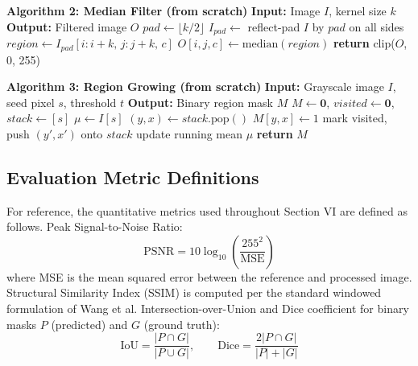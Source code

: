 \documentclass[conference]{IEEEtran}
\begin{document}
\begin{algorithmic}
\STATE \textbf{Algorithm 2: Median Filter (from scratch)}
\STATE \textbf{Input:} Image $I$, kernel size $k$
\STATE \textbf{Output:} Filtered image $O$
\STATE $pad \gets \lfloor k/2 \rfloor$
\STATE $I_{pad} \gets$ reflect-pad $I$ by $pad$ on all sides
    \STATE $region \gets I_{pad}[i{:}i{+}k,\, j{:}j{+}k,\, c]$
    \STATE $O[i,j,c] \gets \text{median}(region)$
\ENDFOR
\STATE \textbf{return} clip($O$, 0, 255)
\end{algorithmic}

\begin{algorithmic}
\STATE \textbf{Algorithm 3: Region Growing (from scratch)}
\STATE \textbf{Input:} Grayscale image $I$, seed pixel $s$, threshold $t$
\STATE \textbf{Output:} Binary region mask $M$
\STATE $M \gets \mathbf{0}$, $visited \gets \mathbf{0}$, $stack \gets [s]$
\STATE $\mu \gets I[s]$ 
    \STATE $(y,x) \gets stack.\text{pop}()$
    \STATE $M[y,x] \gets 1$
            \STATE mark visited, push $(y',x')$ onto $stack$
            \STATE update running mean $\mu$
        \ENDIF
    \ENDFOR
\ENDWHILE
\STATE \textbf{return} $M$
\end{algorithmic}

\subsection{Evaluation Metric Definitions}
For reference, the quantitative metrics used throughout Section VI are defined as follows. Peak Signal-to-Noise Ratio:
\begin{equation}
\text{PSNR} = 10 \log_{10}\left(\frac{255^2}{\text{MSE}}\right)
\end{equation}
where MSE is the mean squared error between the reference and processed image. Structural Similarity Index (SSIM) is computed per the standard windowed formulation of Wang et al. Intersection-over-Union and Dice coefficient for binary masks $P$ (predicted) and $G$ (ground truth):
\begin{equation}
\text{IoU} = \frac{|P \cap G|}{|P \cup G|}, \qquad
\text{Dice} = \frac{2|P \cap G|}{|P| + |G|}
\end{equation}
\end{document}
